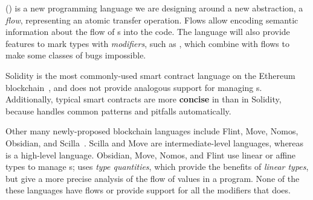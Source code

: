 \documentclass[nonacm, dvipsnames, sigconf]{acmart}
\begin{document}
\langName (\langNamePronounce) is a new programming language we are designing around a new abstraction, a \emph{flow}, representing an atomic transfer operation.
Flows allow encoding semantic information about the flow of \assetTxt{}s into the code.
The \langName language will also provide features to mark types with \emph{modifiers}, such as , which combine with flows to make some classes of bugs impossible.

Solidity is the most commonly-used smart contract language on the Ethereum blockchain~\cite{EthereumForDevs}, and does not provide analogous support for managing \assetTxt{}s.
Additionally, typical smart contracts are more \textbf{concise} in \langName than in Solidity, because \langName handles common patterns and pitfalls automatically.

Other many newly-proposed blockchain languages include Flint, Move, Nomos, Obsidian, and Scilla~\cite{schrans2018flint, blackshear2019move, das2019nomos, coblenz2019obsidian, sergey2019scilla}.
Scilla and Move are intermediate-level languages, whereas \langName is a high-level language.
Obsidian, Move, Nomos, and Flint use linear or affine types to manage \assetTxt{}s; \langName uses \emph{type quantities}, which provide the benefits of \emph{linear types}, but give a more precise analysis of the flow of values in a program.
None of the these languages have flows or provide support for all the modifiers that \langName does.
\end{document}
